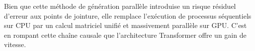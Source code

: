 Bien que cette méthode de génération parallèle introduise un risque résiduel d'erreur aux points de jointure, elle remplace l'exécution de processus séquentiels sur CPU par un calcul matriciel unifié et massivement parallèle sur GPU. C'est en rompant cette chaîne causale que l'architecture Transformer offre un gain de vitesse.

